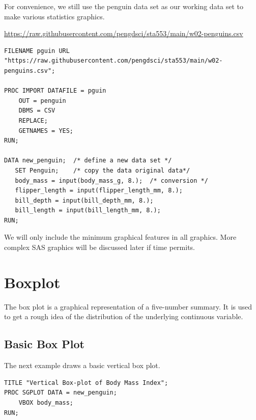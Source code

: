 \documentclass[
]{book}
\begin{document}
For convenience, we still use the penguin data set as our working data set to make various statistics graphics.

\url{https://raw.githubusercontent.com/pengdsci/sta553/main/w02-penguins.csv}

\begin{verbatim}
FILENAME pguin URL "https://raw.githubusercontent.com/pengdsci/sta553/main/w02-penguins.csv";

PROC IMPORT DATAFILE = pguin
    OUT = penguin        
    DBMS = CSV  
    REPLACE;
    GETNAMES = YES;
RUN;

DATA new_penguin;  /* define a new data set */
   SET Penguin;    /* copy the data original data*/
   body_mass = input(body_mass_g, 8.);  /* conversion */
   flipper_length = input(flipper_length_mm, 8.);
   bill_depth = input(bill_depth_mm, 8.);
   bill_length = input(bill_length_mm, 8.);
RUN;
\end{verbatim}

We will only include the minimum graphical features in all graphics. More complex SAS graphics will be discussed later if time permits.

\hypertarget{boxplot}{%
\section{Boxplot}\label{boxplot}}

The box plot is a graphical representation of a five-number summary. It is used to get a rough idea of the distribution of the underlying continuous variable.

\hypertarget{basic-box-plot}{%
\subsection{Basic Box Plot}\label{basic-box-plot}}

The next example draws a basic vertical box plot.

\begin{verbatim}
TITLE "Vertical Box-plot of Body Mass Index";
PROC SGPLOT DATA = new_penguin;
    VBOX body_mass; 
RUN;
\end{verbatim}
\end{document}
